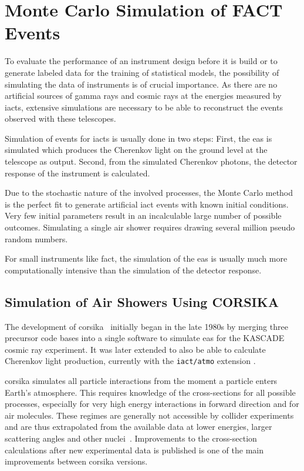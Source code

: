 \chapter{Monte Carlo Simulation of FACT Events}\label{chp:simulation}

To evaluate the performance of an instrument design before it is build
or to generate labeled data for the training of statistical models,
the possibility of simulating the data of instruments is of crucial importance.
As there are no artificial sources of gamma rays and cosmic rays at the energies
measured by \glspl{iact}, extensive simulations are
necessary to be able to reconstruct the events observed with these telescopes.

Simulation of events for \glspl{iact} is usually done in two steps:
First, the \gls{eas} is simulated which produces the Cherenkov light
on the ground level at the telescope as output.
Second, from the simulated Cherenkov photons, the detector response
of the instrument is calculated.

Due to the stochastic nature of the involved processes, the Monte Carlo
method is the perfect fit to generate artificial \gls{iact} events with known
initial conditions.
Very few initial parameters result in an incalculable large number of possible outcomes.
Simulating a single air shower requires drawing several million pseudo random numbers.

For small instruments like \gls{fact}, the simulation of the \gls{eas} is
usually much more computationally intensive than the simulation of the detector response.

\section{Simulation of Air Showers Using CORSIKA}\label{sec:corsika}

The development of \gls{corsika}~\cite{corsika} initially began in the late 1980s by merging
three precursor code bases into a single software to simulate \gls{eas} for
the KASCADE~\cite{kascade} cosmic ray experiment.
It was later extended to also be able to calculate Cherenkov light production,
currently with the \texttt{iact/atmo} extension \cite{iactatmo}.

\gls{corsika} simulates all particle interactions from the moment
a particle enters Earth's atmosphere.
This requires knowledge of the cross-sections for all possible processes,
especially for very high energy interactions in forward direction and for
air molecules.
These regimes are generally not accessible by collider experiments and
are thus extrapolated from the available data at lower energies, larger
scattering angles and other nuclei~\cite{epos-lhc}.
Improvements to the cross-section calculations after new experimental data
is published is one of the main improvements between \gls{corsika} versions.

